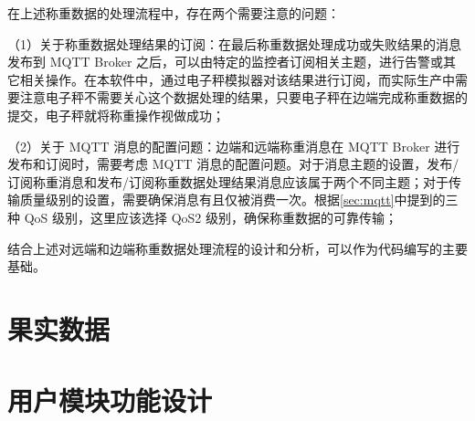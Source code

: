 在上述称重数据的处理流程中，存在两个需要注意的问题：

（1）关于称重数据处理结果的订阅：在最后称重数据处理成功或失败结果的消息发布到 MQTT Broker 之后，可以由特定的监控者订阅相关主题，进行告警或其它相关操作。在本软件中，通过电子秤模拟器对该结果进行订阅，而实际生产中需要注意电子秤不需要关心这个数据处理的结果，只要电子秤在边端完成称重数据的提交，电子秤就将称重操作视做成功；

（2）关于 MQTT 消息的配置问题：边端和远端称重消息在 MQTT Broker 进行发布和订阅时，需要考虑 MQTT 消息的配置问题。对于消息主题的设置，发布/订阅称重消息和发布/订阅称重数据处理结果消息应该属于两个不同主题；对于传输质量级别的设置，需要确保消息有且仅被消费一次。根据\ref{sec:mqtt}中提到的三种 QoS 级别，这里应该选择 QoS2 级别，确保称重数据的可靠传输；

结合上述对远端和边端称重数据处理流程的设计和分析，可以作为代码编写的主要基础。

\section{果实数据}

\section{用户模块功能设计}





